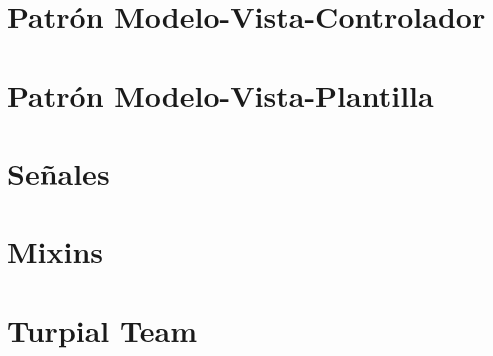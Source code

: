 \section{Patrón Modelo-Vista-Controlador}
\section{Patrón Modelo-Vista-Plantilla}
\section{Señales}
\section{Mixins}
\section{Turpial Team}





